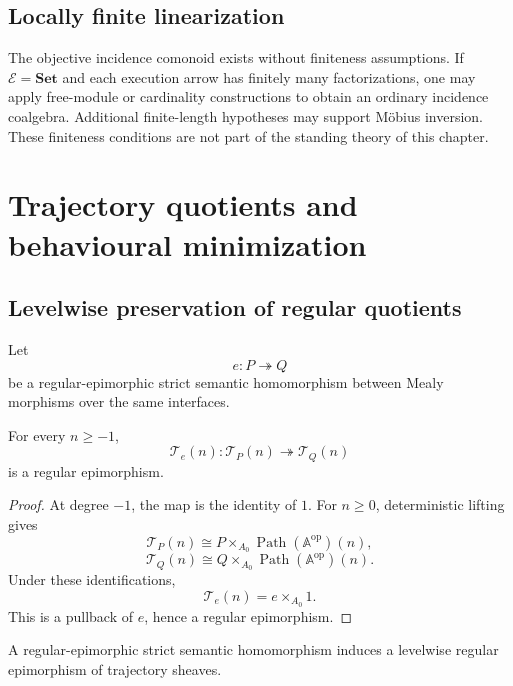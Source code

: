 \subsection{Locally finite linearization}
\label{subsec:locally-finite-linearization}

The objective incidence comonoid exists without finiteness assumptions. If
\(\mathcal E=\mathbf{Set}\) and each execution arrow has finitely many
factorizations, one may apply free-module or cardinality constructions to
obtain an ordinary incidence coalgebra. Additional finite-length hypotheses
may support Möbius inversion. These finiteness conditions are not part of
the standing theory of this chapter.

\section{Trajectory quotients and behavioural minimization}
\label{sec:trajectory-quotients-minimization}

\subsection{Levelwise preservation of regular quotients}
\label{subsec:levelwise-preservation-regular-quotients}

Let
\[
    e:P\twoheadrightarrow Q
\]
be a regular-epimorphic strict semantic homomorphism between Mealy morphisms
over the same interfaces.

\begin{theorem}
\label{thm:trajectory-preservation-regular-quotients}
For every \(n\geq-1\),
\[
    \mathscr T_e(n):
    \mathscr T_P(n)
    \twoheadrightarrow
    \mathscr T_Q(n)
\]
is a regular epimorphism.
\end{theorem}

\begin{proof}
At degree \(-1\), the map is the identity of \(1\). For \(n\geq0\),
deterministic lifting gives
\[
    \mathscr T_P(n)
    \cong
    P\times_{A_0}
    \operatorname{Path}(\mathbb A^{\mathrm{op}})(n),
\]
\[
    \mathscr T_Q(n)
    \cong
    Q\times_{A_0}
    \operatorname{Path}(\mathbb A^{\mathrm{op}})(n).
\]
Under these identifications,
\[
    \mathscr T_e(n)
    =
    e\times_{A_0}1.
\]
This is a pullback of \(e\), hence a regular epimorphism.
\end{proof}

\begin{corollary}
\label{cor:levelwise-quotient-trajectory-sheaves}
A regular-epimorphic strict semantic homomorphism induces a levelwise regular
epimorphism of trajectory sheaves.
\end{corollary}

